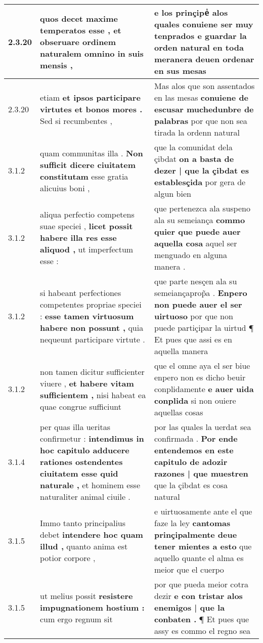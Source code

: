 \begin{tabular}{|p{1cm}|p{6.5cm}|p{6.5cm}|}
2.3.20 & quos decet maxime temperatos esse , \textbf{ et obseruare ordinem naturalem } omnino in suis mensis , & e los prinçipeᷤ alos quales conuiene ser muy tenprados \textbf{ e guardar la orden natural en toda } meranera deuen ordenar en sus mesas \\\hline
2.3.20 & etiam \textbf{ et ipsos participare virtutes et bonos mores . } Sed si recumbentes , & Mas alos que son assentados en las mesas \textbf{ conuiene de escusar muchedunbre de palabras } por que non sea tirada la ordenn natural \\\hline
3.1.2 & quam communitas illa . \textbf{ Non sufficit dicere ciuitatem constitutam } esse gratia alicuius boni , & que la comunidat dela çibdat \textbf{ on a basta de dezer | que la çibdat es establesçida } por gera de algun bien \\\hline
3.1.2 & aliqua perfectio competens suae speciei , \textbf{ licet possit habere illa res esse aliquod , } ut imperfectum esse : & que pertenezca ala suspeno ala su semeiança \textbf{ commo quier que puede auer aquella cosa } aquel ser menguado en alguna manera . \\\hline
3.1.2 & si habeant perfectiones competentes propriae speciei : \textbf{ esse tamen virtuosum habere non possunt , } quia nequeunt participare virtute . & que parte nesçen ala su semeiançaprop̃a . \textbf{ Enpero non puede auer el ser uirtuoso } por que non puede partiçipar la uirtud ¶ Et pues que assi es en aquella manera \\\hline
3.1.2 & non tamen dicitur sufficienter viuere , \textbf{ et habere vitam sufficientem , } nisi habeat ea quae congrue sufficiunt & que el omne aya el ser biue enpero non es dicho beuir conplidamente \textbf{ e auer uida conplida } si non ouiere aquellas cosas \\\hline
3.1.4 & per quas illa ueritas confirmetur : \textbf{ intendimus in hoc capitulo adducere rationes ostendentes ciuitatem esse quid naturale , } et hominem esse naturaliter animal ciuile . & por las quales la uerdat sea confirmada . \textbf{ Por ende entendemos en este capitulo de adozir razones | que muestren } que la çibdat es cosa natural \\\hline
3.1.5 & Immo tanto principalius debet \textbf{ intendere hoc quam illud , } quanto anima est potior corpore , & e uirtuosamente ante el que faze la ley \textbf{ cantomas prinçipalmente deue tener mientes a esto } que aquello quante el alma es meior que el cuerpo \\\hline
3.1.5 & ut melius possit \textbf{ resistere impugnationem hostium : } cum ergo regnum sit & por que pueda meior cotra dezir \textbf{ e con tristar alos enemigos | que la conbaten . } ¶ Et pues que assy es commo el regno sea \\\hline

\end{tabular}
